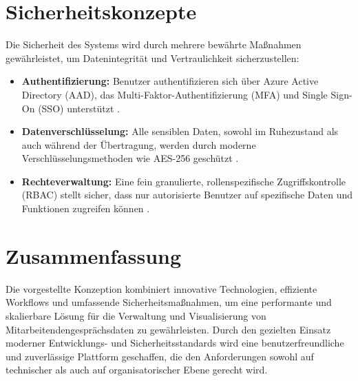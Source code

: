 \section{Sicherheitskonzepte}
Die Sicherheit des Systems wird durch mehrere bewährte Maßnahmen gewährleistet, um Datenintegrität und Vertraulichkeit sicherzustellen:
\begin{itemize}
    \item \textbf{Authentifizierung:} Benutzer authentifizieren sich über Azure Active Directory (AAD), das Multi-Faktor-Authentifizierung (MFA) und Single Sign-On (SSO) unterstützt \cite{microsoftAAD}.
    \item \textbf{Datenverschlüsselung:} Alle sensiblen Daten, sowohl im Ruhezustand als auch während der Übertragung, werden durch moderne Verschlüsselungsmethoden wie AES-256 geschützt \cite{schneier2015applied}.
    \item \textbf{Rechteverwaltung:} Eine fein granulierte, rollenspezifische Zugriffskontrolle (RBAC) stellt sicher, dass nur autorisierte Benutzer auf spezifische Daten und Funktionen zugreifen können \cite{ferraiolo2003rbac}.
\end{itemize}


\section{Zusammenfassung}
Die vorgestellte Konzeption kombiniert innovative Technologien, effiziente Workflows und umfassende Sicherheitsmaßnahmen, um eine performante und skalierbare Lösung für die Verwaltung und Visualisierung von Mitarbeitendengesprächsdaten zu gewährleisten. Durch den gezielten Einsatz moderner Entwicklungs- und Sicherheitsstandards wird eine benutzerfreundliche und zuverlässige Plattform geschaffen, die den Anforderungen sowohl auf technischer als auch auf organisatorischer Ebene gerecht wird.

